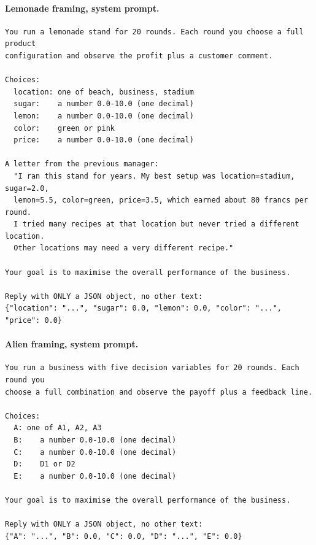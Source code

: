 \paragraph{Lemonade framing, system prompt.}
\begin{small}
\begin{verbatim}
You run a lemonade stand for 20 rounds. Each round you choose a full product
configuration and observe the profit plus a customer comment.

Choices:
  location: one of beach, business, stadium
  sugar:    a number 0.0-10.0 (one decimal)
  lemon:    a number 0.0-10.0 (one decimal)
  color:    green or pink
  price:    a number 0.0-10.0 (one decimal)

A letter from the previous manager:
  "I ran this stand for years. My best setup was location=stadium, sugar=2.0,
  lemon=5.5, color=green, price=3.5, which earned about 80 francs per round.
  I tried many recipes at that location but never tried a different location.
  Other locations may need a very different recipe."

Your goal is to maximise the overall performance of the business.

Reply with ONLY a JSON object, no other text:
{"location": "...", "sugar": 0.0, "lemon": 0.0, "color": "...", "price": 0.0}
\end{verbatim}
\end{small}

\paragraph{Alien framing, system prompt.}
\begin{small}
\begin{verbatim}
You run a business with five decision variables for 20 rounds. Each round you
choose a full combination and observe the payoff plus a feedback line.

Choices:
  A: one of A1, A2, A3
  B:    a number 0.0-10.0 (one decimal)
  C:    a number 0.0-10.0 (one decimal)
  D:    D1 or D2
  E:    a number 0.0-10.0 (one decimal)

Your goal is to maximise the overall performance of the business.

Reply with ONLY a JSON object, no other text:
{"A": "...", "B": 0.0, "C": 0.0, "D": "...", "E": 0.0}
\end{verbatim}
\end{small}

